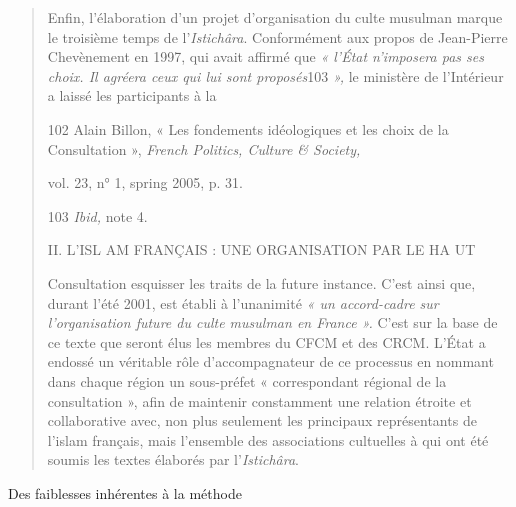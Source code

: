 \begin{quote}
Enfin, l'élaboration d'un projet d'organisation du culte musulman marque
le troisième temps de l'\emph{Istichâra}. Conformément aux propos de
Jean-Pierre Chevènement en 1997, qui avait affirmé que \emph{« l'État
n'imposera pas ses choix. Il agréera ceux qui lui sont proposés}103
\emph{»,} le ministère de l'Intérieur a laissé les participants à la

102 Alain Billon, « Les fondements idéologiques et les choix de la
Consultation », \emph{French Politics, Culture \& Society,}

vol. 23, n° 1, spring 2005, p. 31.

103 \emph{Ibid,} note 4.

II. L'ISL AM FRANÇAIS : UNE ORGANISATION PAR LE HA UT

Consultation esquisser les traits de la future instance. C'est ainsi
que, durant l'été 2001, est établi à l'unanimité \emph{« un accord-cadre
sur l'organisation future du culte musulman en France ».} C'est sur la
base de ce texte que seront élus les membres du CFCM et des CRCM. L'État
a endossé un véritable rôle d'accompagnateur de ce processus en nommant
dans chaque région un sous-préfet « correspondant régional de la
consultation », afin de maintenir constamment une relation étroite et
collaborative avec, non plus seulement les principaux représentants de
l'islam français, mais l'ensemble des associations cultuelles à qui ont
été soumis les textes élaborés par l'\emph{Istichâra}.
\end{quote}

Des faiblesses inhérentes à la méthode

